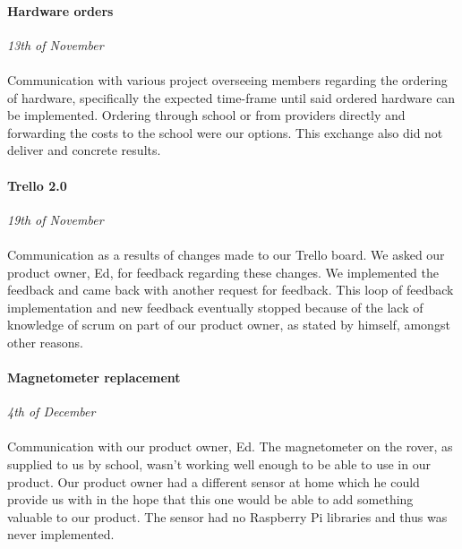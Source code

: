 \documentclass[12pt]{article}
\begin{document}
	\paragraph{Hardware orders}\mbox{}
	\emph{13th of November}\\
	\\Communication with various project overseeing members regarding the ordering of hardware, specifically the expected time-frame until said ordered hardware can be implemented. Ordering through school or from providers directly and forwarding the costs to the school were our options. This exchange also did not deliver and concrete results.
	\paragraph{Trello 2.0}\mbox{}
	\emph{19th of November}\\
	\\Communication as a results of changes made to our Trello board. We asked our product owner, Ed, for feedback regarding these changes. We implemented the feedback and came back with another request for feedback. This loop of feedback implementation and new feedback eventually stopped because of the lack of knowledge of scrum on part of our product owner, as stated by himself, amongst other reasons.
	\paragraph{Magnetometer replacement}\mbox{}
	\emph{4th of December}\\
	\\Communication with our product owner, Ed. The magnetometer on the rover, as supplied to us by school, wasn't working well enough to be able to use in our product. Our product owner had a different sensor at home which he could provide us with in the hope that this one would be able to add something valuable to our product. The sensor had no Raspberry Pi libraries and thus was never implemented.
	\newpage
	\appendix
\end{document}
